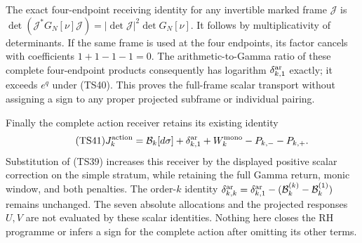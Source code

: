 \documentclass[11pt]{article}
\begin{document}
The exact four-endpoint receiving identity for any invertible marked
frame $\mathcal J$ is
$\det(\mathcal J^*G_N[\nu]\mathcal J)=|\det\mathcal J|^2\det G_N[\nu]$.
It follows by multiplicativity of determinants. If the same frame is
used at the four endpoints, its factor cancels with coefficients
$1+1-1-1=0$. The arithmetic-to-Gamma ratio of these complete
four-endpoint products consequently has logarithm
$\delta_{k,1}^{\rm ar}$ exactly; it exceeds $e^q$ under (TS40).
This proves the full-frame scalar transport without assigning a
sign to any proper projected subframe or individual pairing.

Finally the complete action receiver retains its existing identity
\begin{equation}\tag{TS41}
 J_k^{\rm action}
 =\mathcal B_k[d\sigma]+\delta_{k,1}^{\rm ar}
   +W_k^{\rm mono}-P_{k,-}-P_{k,+}.
\end{equation}
Substitution of (TS39) increases this receiver by the displayed
positive scalar correction on the simple stratum, while retaining
the full Gamma return, monic window, and both penalties. The
order-$k$ identity
$\delta_{k,k}^{\rm ar}=\delta_{k,1}^{\rm ar}
 -(\mathcal B_k^{(k)}-\mathcal B_k^{(1)})$ remains unchanged.
The seven absolute allocations and the projected responses $U,V$
are not evaluated by these scalar identities. Nothing here closes
the RH programme or infers a sign for the complete action after
omitting its other terms.
\end{document}
